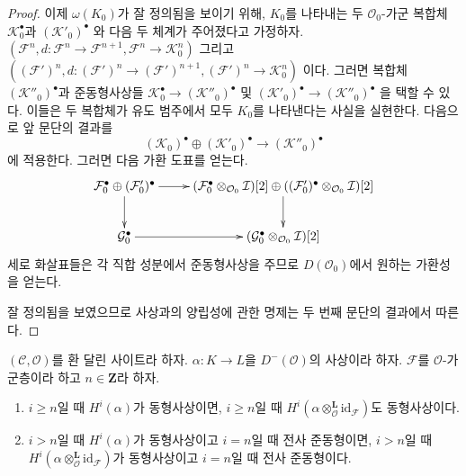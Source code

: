 \begin{proof}
\medskip\noindent
이제 $\omega(K_0)$가 잘 정의됨을 보이기 위해, $K_0$를 나타내는 두
$\mathcal{O}_0$-가군 복합체
$\mathcal{K}_0^\bullet$과 $(\mathcal{K}'_0)^\bullet$
와 다음 두 체계가 주어졌다고 가정하자.
$(\mathcal{F}^n, d : \mathcal{F}^n \to \mathcal{F}^{n + 1},
\mathcal{F}^n \to \mathcal{K}_0^n)$
그리고
$((\mathcal{F}')^n, d : (\mathcal{F}')^n \to (\mathcal{F}')^{n + 1},
(\mathcal{F}')^n \to \mathcal{K}_0^n)$
이다. 그러면 복합체 $(\mathcal{K}''_0)^\bullet$과 준동형사상들
$\mathcal{K}_0^\bullet  \to (\mathcal{K}''_0)^\bullet$
및
$(\mathcal{K}'_0)^\bullet  \to (\mathcal{K}''_0)^\bullet$
을 택할 수 있다. 이들은 두 복합체가 유도 범주에서 모두 $K_0$를
나타낸다는 사실을 실현한다. 다음으로 앞 문단의 결과를
$$
(\mathcal{K}_0)^\bullet \oplus (\mathcal{K}'_0)^\bullet
\longrightarrow
(\mathcal{K}''_0)^\bullet
$$
에 적용한다. 그러면 다음 가환 도표를 얻는다.
$$
\xymatrix{
\mathcal{F}_0^\bullet \oplus (\mathcal{F}'_0)^\bullet
\ar[d] \ar[r] &
(\mathcal{F}_0^\bullet \otimes_{\mathcal{O}_0} \mathcal{I})[2] \oplus
((\mathcal{F}'_0)^\bullet \otimes_{\mathcal{O}_0} \mathcal{I})[2] \ar[d] \\
\mathcal{G}_0^\bullet \ar[r] &
(\mathcal{G}_0^\bullet \otimes_{\mathcal{O}_0} \mathcal{I})[2]
}
$$
세로 화살표들은 각 직합 성분에서 준동형사상을 주므로
$D(\mathcal{O}_0)$에서 원하는 가환성을 얻는다.

\medskip\noindent
잘 정의됨을 보였으므로 사상과의 양립성에 관한 명제는 두 번째 문단의
결과에서 따른다.
\end{proof}

\begin{lemma}
\label{lemma-induced-map}
$(\mathcal{C}, \mathcal{O})$를 환 달린 사이트라 하자.
$\alpha : K \to L$을 $D^-(\mathcal{O})$의 사상이라 하자.
$\mathcal{F}$를 $\mathcal{O}$-가군층이라 하고
$n \in \mathbf{Z}$라 하자.
\begin{enumerate}
\item $i \geq n$일 때 $H^i(\alpha)$가 동형사상이면, $i \geq n$일 때
$H^i(\alpha \otimes_\mathcal{O}^\mathbf{L}
\text{id}_\mathcal{F})$도 동형사상이다.
\item $i > n$일 때 $H^i(\alpha)$가 동형사상이고 $i = n$일 때
전사 준동형이면, $i > n$일 때
$H^i(\alpha \otimes_\mathcal{O}^\mathbf{L}
\text{id}_\mathcal{F})$가 동형사상이고 $i = n$일 때 전사 준동형이다.
\end{enumerate}
\end{lemma}

